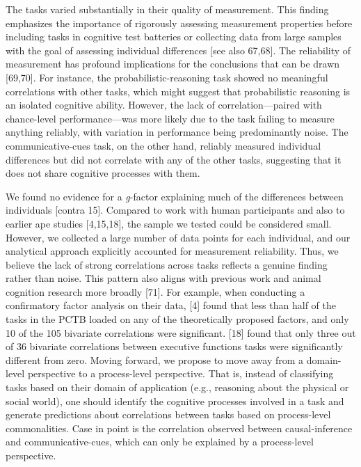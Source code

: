 \documentclass[
  man,floatsintext]{apa6}
\begin{document}
The tasks varied substantially in their quality of measurement. This finding emphasizes the importance of rigorously assessing measurement properties before including tasks in cognitive test batteries or collecting data from large samples with the goal of assessing individual differences {[}see also 67,68{]}. The reliability of measurement has profound implications for the conclusions that can be drawn {[}69,70{]}. For instance, the probabilistic-reasoning task showed no meaningful correlations with other tasks, which might suggest that probabilistic reasoning is an isolated cognitive ability. However, the lack of correlation---paired with chance-level performance---was more likely due to the task failing to measure anything reliably, with variation in performance being predominantly noise. The communicative-cues task, on the other hand, reliably measured individual differences but did not correlate with any of the other tasks, suggesting that it does not share cognitive processes with them.

We found no evidence for a \emph{g}-factor explaining much of the differences between individuals {[}contra 15{]}. Compared to work with human participants and also to earlier ape studies {[}4,15,18{]}, the sample we tested could be considered small. However, we collected a large number of data points for each individual, and our analytical approach explicitly accounted for measurement reliability. Thus, we believe the lack of strong correlations across tasks reflects a genuine finding rather than noise. This pattern also aligns with previous work and animal cognition research more broadly {[}71{]}. For example, when conducting a confirmatory factor analysis on their data, {[}4{]} found that less than half of the tasks in the PCTB loaded on any of the theoretically proposed factors, and only 10 of the 105 bivariate correlations were significant. {[}18{]} found that only three out of 36 bivariate correlations between executive functions tasks were significantly different from zero. Moving forward, we propose to move away from a domain-level perspective to a process-level perspective. That is, instead of classifying tasks based on their domain of application (e.g., reasoning about the physical or social world), one should identify the cognitive processes involved in a task and generate predictions about correlations between tasks based on process-level commonalities. Case in point is the correlation observed between causal-inference and communicative-cues, which can only be explained by a process-level perspective.
\end{document}

